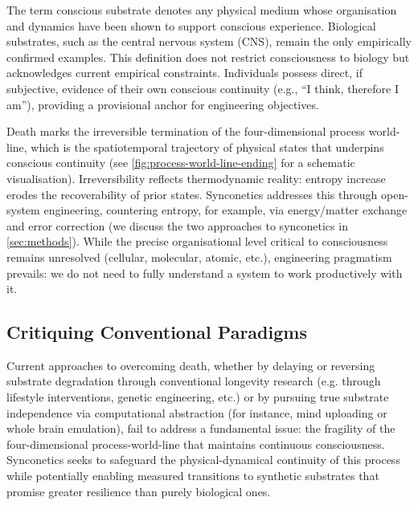 \documentclass[10pt]{article}
\begin{document}
\begin{sloppypar}
  The term conscious substrate denotes any physical medium whose organisation and dynamics have been shown to support conscious experience. Biological substrates, such as the central nervous system (CNS), remain the only empirically confirmed examples. This definition does not restrict consciousness to biology but acknowledges current empirical constraints. Individuals possess direct, if subjective, evidence of their own conscious continuity (e.g., “I think, therefore I am”), providing a provisional anchor for engineering objectives.

  Death marks the irreversible termination of the four-dimensional process world-line, which is the spatiotemporal trajectory of physical states that underpins conscious continuity (see \autoref{fig:process-world-line-ending} for a schematic visualisation). Irreversibility reflects thermodynamic reality: entropy increase erodes the recoverability of prior states. Synconetics addresses this through open-system engineering, countering entropy, for example, via energy/matter exchange and error correction (we discuss the two approaches to synconetics in \autoref{sec:methods}). While the precise organisational level critical to consciousness remains unresolved (cellular, molecular, atomic, etc.), engineering pragmatism prevails: we do not need to fully understand a system to work productively with it.

  \subsection{Critiquing Conventional Paradigms}
  \label{sec:new-paradigm}

  Current approaches to overcoming death, whether by delaying or reversing substrate degradation through conventional longevity research (e.g. through lifestyle interventions, genetic engineering, etc.) or by pursuing true substrate independence via computational abstraction (for instance, mind uploading or whole brain emulation), fail to address a fundamental issue: the fragility of the four-dimensional process-world-line that maintains continuous consciousness. Synconetics seeks to safeguard the physical-dynamical continuity of this process while potentially enabling measured transitions to synthetic substrates that promise greater resilience than purely biological ones.


\end{sloppypar}
\end{document}
